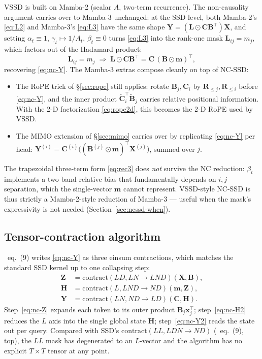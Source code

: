 \documentclass[11pt,a4paper]{article}
\begin{document}
VSSD is built on Mamba-2 (scalar $A$, two-term recurrence). The
non-causality argument carries over to Mamba-3 unchanged: at the SSD
level, both Mamba-2's \eqref{eq:L2} and Mamba-3's \eqref{eq:L3} have
the same shape $\bm{Y} = (\bm{L}\odot\bm{C}\bm{B}^\top)\bm{X}$, and
setting $\alpha_t \equiv 1$, $\gamma_t \mapsto 1/A_t$, $\beta_t \equiv 0$
turns \eqref{eq:L3} into the rank-one mask $\bm{L}_{ij} = m_j$, which
factors out of the Hadamard product:
\begin{equation}
  \bm{L}_{ij} = m_j
  \;\Longrightarrow\;
  \bm{L}\odot\bm{C}\bm{B}^\top
     = \bm{C}\,(\bm{B}\odot\bm{m})^\top,
\end{equation}
recovering \eqref{eq:nc-Y}. The Mamba-3 extras compose cleanly on top
of NC-SSD:
\begin{itemize}
  \item The RoPE trick of \S\ref{sec:rope} still applies: rotate
        $\bm{B}_j, \bm{C}_i$ by $\bm{R}_{\le j}, \bm{R}_{\le i}$ before
        \eqref{eq:nc-Y}, and the inner product
        $\widetilde{\bm{C}}_i^\top \widetilde{\bm{B}}_j$ carries relative
        positional information. With the 2-D factorization
        \eqref{eq:rope2d}, this becomes the 2-D RoPE used by VSSD.
  \item The MIMO extension of \S\ref{sec:mimo} carries over by
        replicating \eqref{eq:nc-Y} per head: $\bm{Y}^{(i)} =
        \bm{C}^{(i)}\bigl((\bm{B}^{(j)}\odot\bm{m})^\top\bm{X}^{(j)}\bigr)$,
        summed over $j$.
\end{itemize}
The trapezoidal three-term form \eqref{eq:rec3} does \emph{not}
survive the NC reduction: $\beta_t$ implements a two-band relative
bias that fundamentally depends on $i,j$ separation, which the
single-vector $\bm{m}$ cannot represent. VSSD-style NC-SSD is thus
strictly a Mamba-2-style reduction of Mamba-3 — useful when the
mask's expressivity is not needed (Section~\ref{sec:ncssd-when}).

\subsection{Tensor-contraction algorithm}\label{sec:ncssd-tensor}

\cite{vssd}~eq.~(9) writes \eqref{eq:nc-Y} as three einsum
contractions, which matches the standard SSD kernel up to one
collapsing step:
\begin{align}
  \bm{Z} &= \mathrm{contract}(LD, LN \to LND)(\bm{X}, \bm{B}), \label{eq:nc-Z}\\
  \bm{H} &= \mathrm{contract}(L, LND \to ND)(\bm{m}, \bm{Z}), \label{eq:nc-H2}\\
  \bm{Y} &= \mathrm{contract}(LN, ND \to LD)(\bm{C}, \bm{H}). \label{eq:nc-Y2}
\end{align}
Step~\eqref{eq:nc-Z} expands each token to its outer product
$\bm{B}_j\bm{x}_j^\top$; step~\eqref{eq:nc-H2} reduces the $L$ axis
into the single global state $\bm{H}$; step~\eqref{eq:nc-Y2} reads
the state out per query. Compared with SSD's
$\mathrm{contract}(LL, LDN \to ND)$ (\cite{vssd}~eq.~(9), top), the
$LL$ mask has degenerated to an $L$-vector and the algorithm has no
explicit $T\times T$ tensor at any point.
\end{document}
